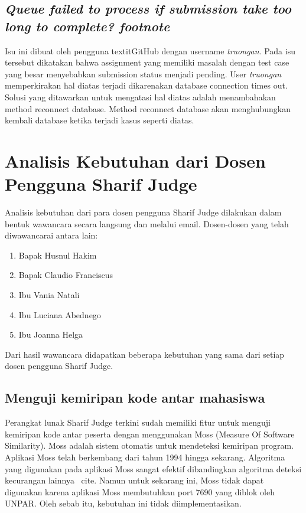 \subsection{\textit{Queue failed to process if submission take too long to complete? footnote}}
Isu ini dibuat oleh pengguna textit{GitHub} dengan username \textit{truongan}. Pada isu tersebut dikatakan bahwa assignment yang memiliki masalah dengan test case yang besar menyebabkan submission status menjadi pending. User \textit{truongan} memperkirakan hal diatas terjadi dikarenakan database connection times out. Solusi yang ditawarkan untuk mengatasi hal diatas adalah menambahakan method reconnect database. Method reconnect database akan menghubungkan kembali database ketika terjadi kasus seperti diatas.

\section{Analisis Kebutuhan dari Dosen Pengguna Sharif Judge}
\label{sec:analisisdosen} 
Analisis kebutuhan dari para dosen pengguna Sharif Judge dilakukan dalam bentuk wawancara secara langsung dan melalui email. Dosen-dosen yang telah diwawancarai antara lain:
\begin{enumerate}
	\item Bapak Husnul Hakim
	\item Bapak Claudio Franciscus
	\item Ibu Vania Natali
	\item Ibu Luciana Abednego
	\item Ibu Joanna Helga
\end{enumerate}
Dari hasil wawancara didapatkan beberapa kebutuhan yang sama dari setiap dosen pengguna Sharif Judge. 

\subsection{Menguji kemiripan kode antar mahasiswa}
Perangkat lunak Sharif Judge terkini sudah memiliki fitur untuk menguji kemiripan kode antar peserta dengan menggunakan Moss (Measure Of Software Similarity). Moss adalah sistem otomatis untuk mendeteksi kemiripan program. Aplikasi Moss telah berkembang dari tahun 1994 hingga sekarang. Algoritma yang digunakan pada aplikasi Moss sangat efektif dibandingkan algoritma deteksi kecurangan lainnya ~cite. Namun untuk sekarang ini, Moss tidak dapat digunakan karena aplikasi Moss membutuhkan port 7690 yang diblok oleh UNPAR. Oleh sebab itu, kebutuhan ini tidak diimplementasikan.

